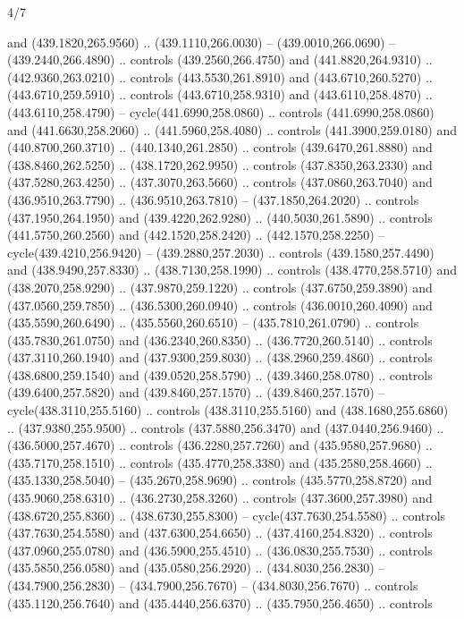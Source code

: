 \begin{flagdescription}{4/7}
\begin{scope}[shift={(0.5\flaglength,0.5\flagwidth)},scale=\flagwidth*\stretchfactor/820]
\begin{scope}[scale=1.87,xshift=-138mm,yshift=75mm]
\begin{scope}[y=0.8pt, x=0.8pt, yscale=-1, xscale=1]
\begin{scope}[fill=c816c2a]
  and (439.1820,265.9560) .. (439.1110,266.0030) -- (439.0010,266.0690) --
  (439.2440,266.4890) .. controls (439.2560,266.4750) and (441.8820,264.9310) ..
  (442.9360,263.0210) .. controls (443.5530,261.8910) and (443.6710,260.5270) ..
  (443.6710,259.5910) .. controls (443.6710,258.9310) and (443.6110,258.4870) ..
  (443.6110,258.4790) -- cycle(441.6990,258.0860) .. controls
  (441.6990,258.0860) and (441.6630,258.2060) .. (441.5960,258.4080) .. controls
  (441.3900,259.0180) and (440.8700,260.3710) .. (440.1340,261.2850) .. controls
  (439.6470,261.8880) and (438.8460,262.5250) .. (438.1720,262.9950) .. controls
  (437.8350,263.2330) and (437.5280,263.4250) .. (437.3070,263.5660) .. controls
  (437.0860,263.7040) and (436.9510,263.7790) .. (436.9510,263.7810) --
  (437.1850,264.2020) .. controls (437.1950,264.1950) and (439.4220,262.9280) ..
  (440.5030,261.5890) .. controls (441.5750,260.2560) and (442.1520,258.2420) ..
  (442.1570,258.2250) -- cycle(439.4210,256.9420) -- (439.2880,257.2030) ..
  controls (439.1580,257.4490) and (438.9490,257.8330) .. (438.7130,258.1990) ..
  controls (438.4770,258.5710) and (438.2070,258.9290) .. (437.9870,259.1220) ..
  controls (437.6750,259.3890) and (437.0560,259.7850) .. (436.5300,260.0940) ..
  controls (436.0010,260.4090) and (435.5590,260.6490) .. (435.5560,260.6510) --
  (435.7810,261.0790) .. controls (435.7830,261.0750) and (436.2340,260.8350) ..
  (436.7720,260.5140) .. controls (437.3110,260.1940) and (437.9300,259.8030) ..
  (438.2960,259.4860) .. controls (438.6800,259.1540) and (439.0520,258.5790) ..
  (439.3460,258.0780) .. controls (439.6400,257.5820) and (439.8460,257.1570) ..
  (439.8460,257.1570) -- cycle(438.3110,255.5160) .. controls
  (438.3110,255.5160) and (438.1680,255.6860) .. (437.9380,255.9500) .. controls
  (437.5880,256.3470) and (437.0440,256.9460) .. (436.5000,257.4670) .. controls
  (436.2280,257.7260) and (435.9580,257.9680) .. (435.7170,258.1510) .. controls
  (435.4770,258.3380) and (435.2580,258.4660) .. (435.1330,258.5040) --
  (435.2670,258.9690) .. controls (435.5770,258.8720) and (435.9060,258.6310) ..
  (436.2730,258.3260) .. controls (437.3600,257.3980) and (438.6720,255.8360) ..
  (438.6730,255.8300) -- cycle(437.7630,254.5580) .. controls
  (437.7630,254.5580) and (437.6300,254.6650) .. (437.4160,254.8320) .. controls
  (437.0960,255.0780) and (436.5900,255.4510) .. (436.0830,255.7530) .. controls
  (435.5850,256.0580) and (435.0580,256.2920) .. (434.8030,256.2830) --
  (434.7900,256.2830) -- (434.7900,256.7670) -- (434.8030,256.7670) .. controls
  (435.1120,256.7640) and (435.4440,256.6370) .. (435.7950,256.4650) .. controls

\end{scope}
\end{scope}
\end{scope}
\end{scope}
\end{flagdescription}
